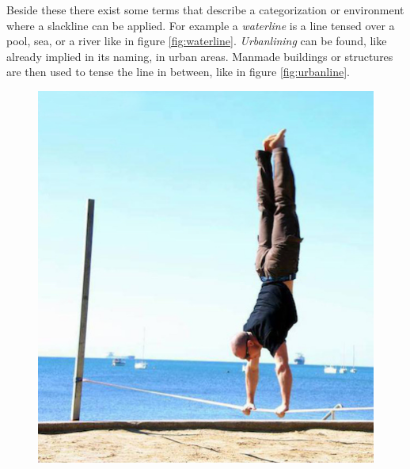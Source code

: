 Beside these there exist some terms that describe a categorization or environment where a slackline can be applied. For example a \textit{waterline} is a line tensed over a pool, sea, or a river like in figure \ref{fig:waterline}. \textit{Urbanlining} can be found, like already implied in its naming, in urban areas. Manmade buildings or structures are then used to tense the line in between, like in figure \ref{fig:urbanline}.
\begin{figure}[htb]
	\centering
	\begin{minipage}[t]{0.45\linewidth}
		\centering
		\includegraphics[width=1\linewidth]{Pictures/3_1_trickline}
		\label{fig:trickline}
	\end{minipage}
	\hfill
	\begin{minipage}[t]{0.45\linewidth}
		\centering

\end{minipage}
\end{figure}
